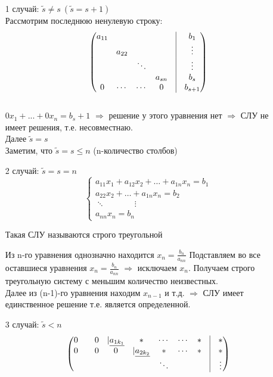 \documentclass[a4paper, 12pt]{article}
\theoremstyle{definition}
\begin{document}
  \begin{itemize}
    \item[1 случай:]
    $\widetilde{s} \neq s \ (\widetilde{s}=s+1)$ \\ 
    Рассмотрим последнюю ненулевую строку:
    $$\begin{pmatrix}
      a_{11} & \null & \null & \null & \vline & b_1 \\
      \null & a_{22} & \null & \null & \vline & \vdots \\
      \null & \null & \ddots & \null & \vline & \vdots \\
      \null & \null & \null & a_{sn} & \vline & b_s \\
      0 & \cdots & \cdots & 0 & \vline & b_{s+1}
    \end{pmatrix}$$ \\
    $0x_1+...+0x_n=b_s+1$ 
    $\Longrightarrow$ решение у этого уравнения нет 
    $\Longrightarrow$ СЛУ не имеет решения, т.е. несовместнаю. \\
    Далее $\widetilde{s}=s$\\
    Заметим, что $\widetilde{s}=s\leq n$ (n-количество столбов)
    \item[2 случай:] $\widetilde{s}=s=n$  
    $$\left\{ \begin{aligned}
      a_{11} x_1 + a_{12} x_2+ \dots + a_{1n} x_n = b_1 \\
      a_{22} x_2 + \dots + a_{1n} x_n = b_2 \\ 
      \ddots \ \ \ \ \ \ \ \ \ \ \ \ \ \ \ \ \vdots \ \\
      a_{nn} x_n = b_n
    \end{aligned}
    \right.$$

    Такая СЛУ называются строго треугольной

    Из n-го уравнения однозначно находится $x_n = \frac{b_n}{a_{nn}}$
    Подставляем во все оставшиеся уравнения $x_n = \frac{b_n}{a_{nn}}$ $\Longrightarrow$ исключаем $x_n$. Получаем строго треугольную систему с меньшим количество неизвестных.  \\
    Далее из (n-1)-го уравнения  находим $x_{n-1}$ и т.д. $\Longrightarrow$ СЛУ имеет единственное решение т.е. является определенной.

    \item[3 случай:] $\widetilde{s}<n$ 
  $$\begin{pmatrix}
    0 & \null & 0 & |\underline{a_{1k_1}} & \ast & \cdots & \cdots & \ast & \vline & \ast  \\
    0 & \null & 0 & 0 & |\underline{a_{2k_2}} & \ast & \cdots & \ast & \vline & \ast \\
    \null & \null & \null & \null & \null & \ddots & \null & \null & \vline & \vdots
  \end{pmatrix}$$ 


\end{itemize}
\end{document}
